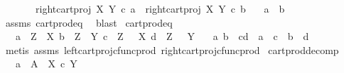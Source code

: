 \begin{isabellebody}
\ \ \ \ \ \ {\isasymand}\ right{\isacharunderscore}{\kern0pt}cart{\isacharunderscore}{\kern0pt}proj\ X\ Y\ {\isasymcirc}\isactrlsub c\ a\ {\isacharequal}{\kern0pt}\ right{\isacharunderscore}{\kern0pt}cart{\isacharunderscore}{\kern0pt}proj\ X\ Y\ {\isasymcirc}\isactrlsub c\ b{\isacharparenright}{\kern0pt}{\isachardoublequoteclose}\isanewline
\ \ \ {\isachardoublequoteopen}a\ {\isacharequal}{\kern0pt}\ b{\isachardoublequoteclose}\isanewline
%
\isadelimproof
\ \ %
\endisadelimproof
%
\isatagproof
{}\isamarkupfalse%
\ assms\ cart{\isacharunderscore}{\kern0pt}prod{\isacharunderscore}{\kern0pt}eq\ \isamarkupfalse%
\ blast%
\endisatagproof
{\isafoldproof}%
%
\isadelimproof
\isanewline
%
\endisadelimproof
\isanewline
{}\isamarkupfalse%
\ cart{\isacharunderscore}{\kern0pt}prod{\isacharunderscore}{\kern0pt}eq{}{\isacharcolon}{\kern0pt}\isanewline
\ \ \ {\isachardoublequoteopen}a\ {\isacharcolon}{\kern0pt}\ Z\ {\isasymrightarrow}\ X{\isachardoublequoteclose}\ {\isachardoublequoteopen}b\ {\isacharcolon}{\kern0pt}\ Z\ {\isasymrightarrow}\ Y{\isachardoublequoteclose}\ {\isachardoublequoteopen}c\ {\isacharcolon}{\kern0pt}\ Z\ {\isasymrightarrow}\ \ X{\isachardoublequoteclose}\ {\isachardoublequoteopen}d\ {\isacharcolon}{\kern0pt}\ Z\ {\isasymrightarrow}\ \ Y{\isachardoublequoteclose}\isanewline
\ \ \ {\isachardoublequoteopen}{\isasymlangle}a{\isacharcomma}{\kern0pt}\ b{\isasymrangle}\ {\isacharequal}{\kern0pt}\ {\isasymlangle}c{\isacharcomma}{\kern0pt}d{\isasymrangle}\ {\isasymlongleftrightarrow}\ {\isacharparenleft}{\kern0pt}a\ {\isacharequal}{\kern0pt}\ c\ {\isasymand}\ b\ {\isacharequal}{\kern0pt}\ d{\isacharparenright}{\kern0pt}{\isachardoublequoteclose}\isanewline
%
\isadelimproof
\ \ %
\endisadelimproof
%
\isatagproof
{}\isamarkupfalse%
\ {\isacharparenleft}{\kern0pt}metis\ assms\ left{\isacharunderscore}{\kern0pt}cart{\isacharunderscore}{\kern0pt}proj{\isacharunderscore}{\kern0pt}cfunc{\isacharunderscore}{\kern0pt}prod\ right{\isacharunderscore}{\kern0pt}cart{\isacharunderscore}{\kern0pt}proj{\isacharunderscore}{\kern0pt}cfunc{\isacharunderscore}{\kern0pt}prod{\isacharparenright}{\kern0pt}%
\endisatagproof
{\isafoldproof}%
%
\isadelimproof
\isanewline
%
\endisadelimproof
\isanewline
{}\isamarkupfalse%
\ cart{\isacharunderscore}{\kern0pt}prod{\isacharunderscore}{\kern0pt}decomp{\isacharcolon}{\kern0pt}\isanewline
\ \ \ {\isachardoublequoteopen}a\ {\isacharcolon}{\kern0pt}\ A\ {\isasymrightarrow}\ X\ {\isasymtimes}\isactrlsub c\ Y{\isachardoublequoteclose}\isanewline

\end{isabellebody}
